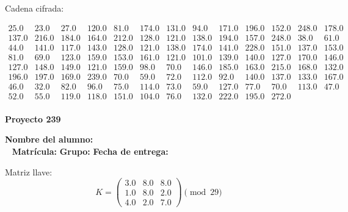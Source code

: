 \documentclass[12pt]{article}
\begin{document}
Cadena cifrada:
\begin{center}
$\begin{array}{lllllllllllll}
25.0 & 23.0 & 27.0 & 120.0 & 81.0 & 174.0 & 131.0 & 94.0 & 171.0 & 196.0 & 152.0 & 248.0 & 178.0\\
137.0 & 216.0 & 184.0 & 164.0 & 212.0 & 128.0 & 121.0 & 138.0 & 194.0 & 157.0 & 248.0 & 38.0 & 61.0\\
44.0 & 141.0 & 117.0 & 143.0 & 128.0 & 121.0 & 138.0 & 174.0 & 141.0 & 228.0 & 151.0 & 137.0 & 153.0\\
81.0 & 69.0 & 123.0 & 159.0 & 153.0 & 161.0 & 121.0 & 101.0 & 139.0 & 140.0 & 127.0 & 170.0 & 146.0\\
127.0 & 148.0 & 149.0 & 121.0 & 159.0 & 98.0 & 70.0 & 146.0 & 185.0 & 163.0 & 215.0 & 168.0 & 132.0\\
196.0 & 197.0 & 169.0 & 239.0 & 70.0 & 59.0 & 72.0 & 112.0 & 92.0 & 140.0 & 137.0 & 133.0 & 167.0\\
46.0 & 32.0 & 82.0 & 96.0 & 75.0 & 114.0 & 73.0 & 59.0 & 127.0 & 77.0 & 70.0 & 113.0 & 47.0\\
52.0 & 55.0 & 119.0 & 118.0 & 151.0 & 104.0 & 76.0 & 132.0 & 222.0 & 195.0 & 272.0\\
\end{array}$
\end{center}

\newpage


\textbf{Proyecto 239}

\textbf{Nombre del alumno:} \underline{\hspace{13cm}}\\\
\vspace{1cm}
\textbf{Matrícula:} \underline{\hspace{4cm}} \hspace{1cm}
\textbf{Grupo:} \underline{\hspace{2cm}}
\textbf{Fecha de entrega:} \underline{\hspace{2cm}}

\medskip

Matriz llave:
\[
K = \begin{pmatrix}
3.0 & 8.0 & 8.0\\
1.0 & 8.0 & 2.0\\
4.0 & 2.0 & 7.0
\end{pmatrix} \pmod{29}
\]
\end{document}
